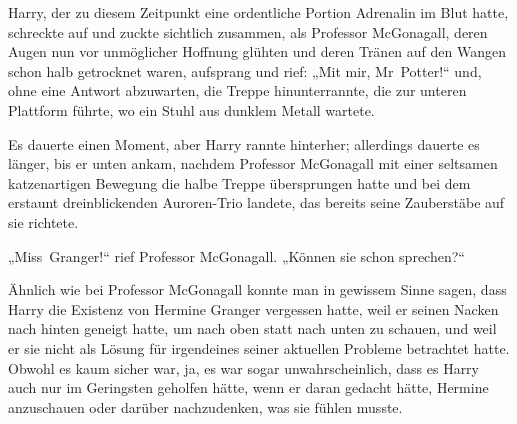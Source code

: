 Harry, der zu diesem Zeitpunkt eine ordentliche Portion Adrenalin im Blut hatte, schreckte auf und zuckte sichtlich zusammen, als Professor McGonagall, deren Augen nun vor unmöglicher Hoffnung glühten und deren Tränen auf den Wangen schon halb getrocknet waren, aufsprang und rief:
„Mit mir, Mr~Potter!“ und, ohne eine Antwort abzuwarten, die Treppe hinunterrannte, die zur unteren Plattform führte, wo ein Stuhl aus dunklem Metall wartete.

Es dauerte einen Moment, aber Harry rannte hinterher; allerdings dauerte es länger, bis er unten ankam, nachdem Professor McGonagall mit einer seltsamen katzenartigen Bewegung die halbe Treppe übersprungen hatte und bei dem erstaunt dreinblickenden Auroren-Trio landete, das bereits seine Zauberstäbe auf sie richtete.

„Miss~Granger!“ rief Professor McGonagall.
„Können sie schon sprechen?“

Ähnlich wie bei Professor McGonagall konnte man in gewissem Sinne sagen, dass Harry die Existenz von Hermine Granger vergessen hatte, weil er seinen Nacken nach hinten geneigt hatte, um nach oben statt nach unten zu schauen, und weil er sie nicht als Lösung für irgendeines seiner aktuellen Probleme betrachtet hatte. Obwohl es kaum sicher war, ja, es war sogar unwahrscheinlich, dass es Harry auch nur im Geringsten geholfen hätte, wenn er daran gedacht hätte, Hermine anzuschauen oder darüber nachzudenken, was sie fühlen musste.

